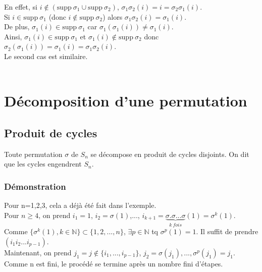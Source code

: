 \documentclass[a4paper,10pt]{book} %
\newcommand{\N}{\mathbb{N}}
\newcommand{\supp}{\mathrm{supp}~} %
\begin{document}
En effet, si $i\notin (\supp \sigma_1 \cup \supp \sigma_2)$, $\sigma_1\sigma_2(i)=i=\sigma_2\sigma_1(i)$.\\

Si $i\in \supp \sigma_1$ (donc $i\notin \supp \sigma_2$) alors $\sigma_1\sigma_2(i)=\sigma_1(i)$.\\

De plus, $\sigma_1(i)\in \supp \sigma_1$ car $\sigma_1(\sigma_1(i))\neq\sigma_1(i)$.\\

Ainsi, $\sigma_1(i)\in\supp \sigma_1$ et $\sigma_1(i)\notin \supp \sigma_2$ donc $\sigma_2(\sigma_1(i))=\sigma_1(i)=\sigma_1\sigma_2(i)$.\\

Le second cas est similaire.\\\\

\section{Décomposition d'une permutation}
\subsection{Produit de cycles}
Toute permutation $\sigma$ de $S_n$ se décompose en produit de cycles disjoints. On dit que les cycles engendrent $S_n$.\\

\subsubsection{Démonstration}
Pour n=1,2,3, cela a déjà été fait dans l'exemple.\\

Pour $n\geq 4$, on prend $i_1=1$, $i_2=\sigma(1)$,..., $i_{k+1} = \underset{k~fois}{\underbrace{\sigma.\sigma...\sigma}}(1)=\sigma^k(1)$.\\

Comme $\{\sigma^k(1), k\in \N\}\subset \{1,2,...,n\}$, $\exists p\in \N$ tq $\sigma^p(1)=1$.
Il suffit de prendre $(i_1i_2...i_{p-1})$.\\

Maintenant, on prend $j_1=j\notin\{i_1,...,i_{p-1}\}$, $j_2=\sigma(j_1),...,\sigma^p(j_1)=j_1$.\\
Comme n est fini, le procédé se termine après un nombre fini d'étapes.\\
\end{document}
